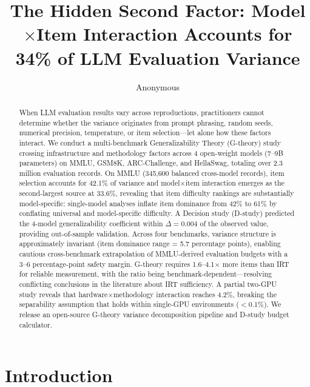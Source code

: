 \documentclass[letterpaper]{article}
\title{The Hidden Second Factor: Model$\times$Item Interaction Accounts for 34\% of LLM Evaluation Variance}
\author{Anonymous}
\date{}
\begin{document}
\maketitle

\begin{abstract}
When LLM evaluation results vary across reproductions, practitioners cannot determine whether the variance originates from prompt phrasing, random seeds, numerical precision, temperature, or item selection---let alone how these factors interact.
We conduct a multi-benchmark Generalizability Theory (G-theory) study crossing infrastructure and methodology factors across 4 open-weight models (7--9B parameters) on MMLU, GSM8K, ARC-Challenge, and HellaSwag, totaling over 2.3 million evaluation records.
On MMLU (345,600 balanced cross-model records), item selection accounts for 42.1\% of variance and model$\times$item interaction emerges as the second-largest source at 33.6\%, revealing that item difficulty rankings are substantially model-specific: single-model analyses inflate item dominance from 42\% to 61\% by conflating universal and model-specific difficulty.
A Decision study (D-study) predicted the 4-model generalizability coefficient within $\Delta=0.004$ of the observed value, providing out-of-sample validation.
Across four benchmarks, variance structure is approximately invariant (item dominance range = 5.7 percentage points), enabling cautious cross-benchmark extrapolation of MMLU-derived evaluation budgets with a 3--6 percentage-point safety margin.
G-theory requires 1.6--4.1$\times$ more items than IRT for reliable measurement, with the ratio being benchmark-dependent---resolving conflicting conclusions in the literature about IRT sufficiency.
A partial two-GPU study reveals that hardware$\times$methodology interaction reaches 4.2\%, breaking the separability assumption that holds within single-GPU environments ($<$0.1\%).
We release an open-source G-theory variance decomposition pipeline and D-study budget calculator.
\end{abstract}

\section{Introduction}
\end{document}
